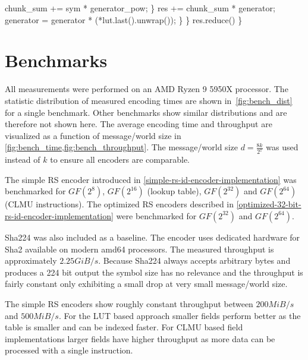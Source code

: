 \documentclass[
]{article}
\newenvironment{Shaded}{}{}
\newcommand{\NormalTok}[1]{#1}
\newcommand{\OperatorTok}[1]{\textcolor[rgb]{0.40,0.40,0.40}{#1}}
\begin{document}
\begin{Shaded}
\begin{Highlighting}[]
\NormalTok{                chunk\_sum }\OperatorTok{+=}\NormalTok{ sym }\OperatorTok{*}\NormalTok{ generator\_pow}\OperatorTok{;}
            \OperatorTok{\}}
\NormalTok{            res }\OperatorTok{+=}\NormalTok{ chunk\_sum }\OperatorTok{*}\NormalTok{ generator}\OperatorTok{;}
\NormalTok{            generator }\OperatorTok{=}\NormalTok{ generator }\OperatorTok{*}\NormalTok{ (}\OperatorTok{*}\NormalTok{lut}\OperatorTok{.}\NormalTok{last()}\OperatorTok{.}\NormalTok{unwrap())}\OperatorTok{;}
        \OperatorTok{\}}
    \OperatorTok{\}}
\NormalTok{    res}\OperatorTok{.}\NormalTok{reduce()}
\OperatorTok{\}}
\end{Highlighting}
\end{Shaded}
\vfill

\newpage

\section{Benchmarks}
\label{sec:bench}

All measurements were performed on an AMD Ryzen 9 5950X processor. The statistic distribution of measured encoding times are shown in~\cref{fig:bench_dist} for a single benchmark. Other benchmarks show similar distributions and are therefore not shown here. The average encoding time and throughput are visualized as a function of message/world size in \cref{fig:bench_time,fig:bench_throughput}. The message/world size $d=\frac{8k}{2^z}$ was used instead of $k$ to ensure all encoders are comparable.


The simple RS encoder introduced in \cref{simple-rs-id-encoder-implementation} was benchmarked for $GF(2^8)$, $GF(2^{16})$ (lookup table), $GF(2^{32})$ and $GF(2^{64})$ (CLMU instructions). The optimized RS encoders described in \cref{optimized-32-bit-rs-id-encoder-implementation} were benchmarked for $GF(2^{32})$ and $GF(2^{64})$. 

Sha224 was also included as a baseline. The encoder uses dedicated hardware for Sha2 available on modern amd64 processors. The measured throughput is approximately $2.25GiB/s$. Because Sha224 always accepts arbitrary bytes and produces a 224 bit output the symbol size has no relevance and the throughput is fairly constant only exhibiting a small drop at very small message/world size. 

The simple RS encoders show roughly constant throughput between $200MiB/s$ and $500MiB/s$. For the LUT based approach smaller fields perform better as the table is smaller and can be indexed faster. For CLMU based field implementations larger fields have higher throughput as more data can be processed with a single instruction. 
\end{document}
